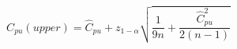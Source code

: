 

\[
C_{pu}(upper) = \hat{C}_{pu} + z_{1-\alpha}\sqrt{\frac{1}{9n} + \frac{\hat{C}_{pu}^{2}}{2(n-1)}}
\]


